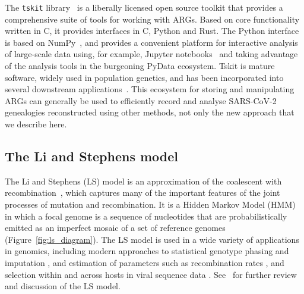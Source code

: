 \documentclass{article}
\begin{document}
The \texttt{tskit} library~\citep{Tskit2023-tskit} is a liberally
licensed open source toolkit that provides a comprehensive suite
of tools for working with ARGs. Based on core functionality written
in C, it provides interfaces in C, Python and Rust. The Python interface
is based on NumPy~\citep{Harris2020-array}, and provides a convenient
platform for interactive analysis of large-scale data using, for
example, Jupyter notebooks~\citep{Kluyver2016-jupyter} and taking
advantage of the analysis tools in the burgeoning PyData ecosystem.
Tskit is mature software, widely used in population genetics, and
has been incorporated into several downstream
applications~\citep[e.g.][]{Haller2019-slim,Speidel2019-yh,
Terasaki2021-geonomics,
Fan2022-genealogical,Korfmann2022-weak,
Mahmoudi2022-bayesian,Petr2022-slendr,Rasmussen2022-espalier}.
This ecosystem for storing and manipulating ARGs can
generally be used to efficiently record and analyse SARS-CoV-2 genealogies reconstructed
using other methods, not only the new approach that we describe here.

\subsection{The Li and Stephens model}
\label{sec:ls}
The Li and Stephens (LS) model \citep{Li2003-ib} is an approximation of the
coalescent with recombination~\citep{Hudson1983-properties}, which captures
many of the important features of the joint processes of mutation and
recombination. It is a Hidden Markov Model (HMM) in which a focal genome is a
sequence of nucleotides that are probabilistically emitted as
an imperfect mosaic of a set of reference genomes
(Figure~\ref{fig:ls_diagram}).
The LS model is used in a wide variety
of applications in genomics, including modern approaches to
statistical genotype phasing and imputation
\citep{Delaneau2019-wl,Browning2021-cg,Browning2018-nk,Rubinacci2020-pa},
and estimation of parameters such as
recombination rates \citep[e.g.][]{Hinch2011-tz},
and selection within and across hosts in viral
sequence data \citep[e.g.][]{Palmer2019-wa}.
See~\cite{Mcvean2019-linkage} for further review and discussion
of the LS model.
\end{document}

